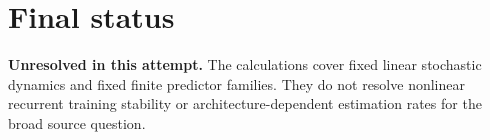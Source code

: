 \documentclass[11pt]{article}
\begin{document}
\section{Final status}
\textbf{Unresolved in this attempt.} The calculations cover fixed linear stochastic dynamics and fixed finite predictor families. They do not resolve nonlinear recurrent training stability or architecture-dependent estimation rates for the broad source question.
\end{document}
